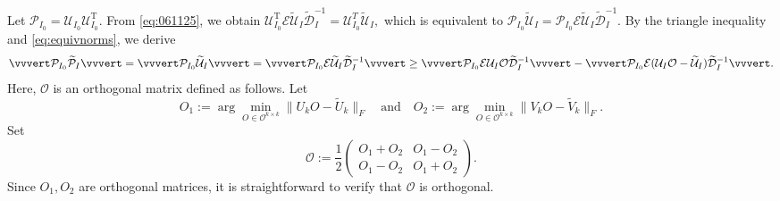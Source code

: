 \documentclass[reqno]{amsart}
\newcommand{\T}{\mathrm{T}}
\theoremstyle{plain}
\theoremstyle{definition}
\begin{document}
Let $\mathcal P_{I_0} = \mathcal U_{I_0} \mathcal U_{I_0}^\T$. From \eqref{eq:061125}, we obtain $\mathcal U_{I_0}^\T \mathcal E \widetilde{\mathcal U}_{I} \widetilde{\mathcal D}_I^{-1}= \mathcal U_{I_0}^T  \widetilde{\mathcal U}_I,$ which is equivalent to $\mathcal P_{I_0} \widetilde{\mathcal U}_{I} = \mathcal P_{I_0} \mathcal E \widetilde{\mathcal U}_{I} \widetilde{\mathcal D}_I^{-1}$.  By the triangle inequality and \eqref{eq:equivnorms}, we derive
\begin{align}\label{eq:begineq}
\vvvert \mathcal P_{I_0} \widetilde{\mathcal P}_{I} \vvvert = \vvvert \mathcal P_{I_0} \widetilde{\mathcal U}_{I} \vvvert = \vvvert \mathcal P_{I_0} \mathcal E \widetilde{\mathcal U}_{I} \widetilde{\mathcal D}_I^{-1} \vvvert \ge \vvvert \mathcal P_{I_0} \mathcal E {\mathcal U}_{I}\mathcal O \widetilde{\mathcal D}_I^{-1} \vvvert - \vvvert \mathcal P_{I_0} \mathcal E ({\mathcal U}_{I}\mathcal O- \widetilde{\mathcal U}_{I}) \widetilde{\mathcal D}_I^{-1} \vvvert.
\end{align}
Here, $\mathcal O$ is an orthogonal matrix defined as follows. Let $$O_1 := \arg\min_{O\in\mathcal O^{k\times k}}\|U_k O-\widetilde{U}_k\|_F \quad\text{and}\quad O_2 := \arg\min_{O\in\mathcal O^{k\times k}}\|V_k O-\widetilde{V}_k\|_F.$$ Set $$\mathcal O:=\frac{1}{2}\begin{pmatrix}
O_1 + O_2& O_1-O_2\\
O_1 - O_2 & O_1 + O_2
\end{pmatrix}.
 $$
Since $O_1, O_2$ are orthogonal matrices, it is straightforward to verify that $\mathcal O$ is orthogonal.
 
\end{document}
